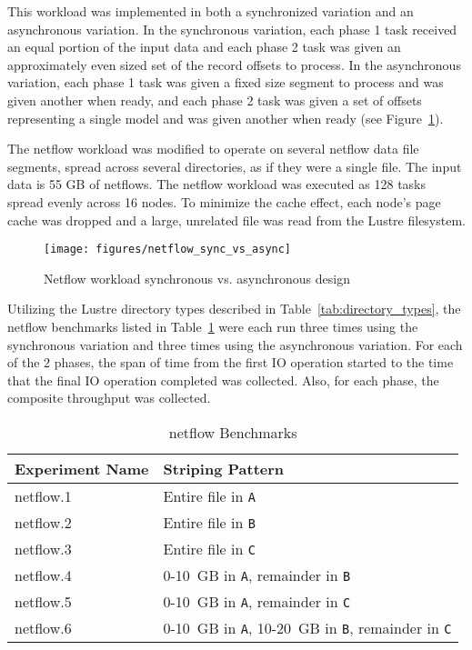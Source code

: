 \documentclass[conference,compsoc]{IEEEtran}
\begin{document}
This workload was implemented in both a synchronized variation and an asynchronous variation. In the synchronous variation, each phase 1 task received an equal portion of the input data and each phase 2 task was given an approximately even sized set of the record offsets to process. In the asynchronous variation, each phase 1 task was given a fixed size segment to process and was given another when ready, and each phase 2 task was given a set of offsets representing a single model and was given another when ready (see Figure~\ref{fig:netflow}).

The netflow workload was modified to operate on several netflow data file segments, spread across several directories, as if they were a single file. The input data is 55 GB of netflows. The netflow workload was executed as 128 tasks spread evenly across 16 nodes. To minimize the cache effect, each node's page cache was dropped and a large, unrelated file was read from the Lustre filesystem.

\begin{figure}[t]
\centering
  \texttt{[image: figures/netflow\_sync\_vs\_async]}
\caption{Netflow workload \- synchronous vs. asynchronous design}
\label{fig:netflow}
\end{figure}

Utilizing the Lustre directory types described in Table~\ref{tab:directory_types}, the 
netflow benchmarks listed in Table~\ref{tab:netflow_benchmarks} were each run three times using the synchronous variation and three times using the asynchronous variation. For each of the 2 phases, the span of time from the first IO operation started to the time that the final IO operation completed was collected. Also, for each phase, the composite throughput was collected.

\begin{table}[h]
\centering
\caption{netflow Benchmarks}
\label{tab:netflow_benchmarks}
\begin{tabular}{ll}
Experiment Name & Striping Pattern \\
\hline
netflow.1 & Entire file in \texttt{A} \\
netflow.2 & Entire file in \texttt{B} \\
netflow.3 & Entire file in \texttt{C} \\
netflow.4 & 0-10~GB in \texttt{A}, remainder in \texttt{B} \\
netflow.5 & 0-10~GB in \texttt{A}, remainder in \texttt{C} \\
netflow.6 & 0-10~GB in \texttt{A}, 10-20~GB in \texttt{B}, remainder in \texttt{C} \\
\end{tabular}
\end{table}
\end{document}
